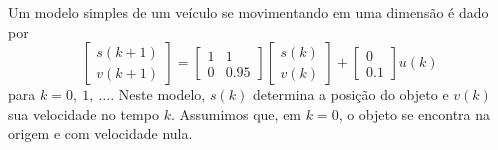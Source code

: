 \begin{problem}
Um modelo simples de um veículo se movimentando em uma dimensão é dado por
         \begin{equation*}
           \begin{bmatrix} s(k+1) \\ v(k+1) \end{bmatrix} = \begin{bmatrix} 1 & 1 \\ 0 & 0.95 \end{bmatrix} \begin{bmatrix} s(k) \\ v(k) \end{bmatrix} + \begin{bmatrix} 0 \\ 0.1 \end{bmatrix} u(k)
         \end{equation*}
para $k = 0,~1,~\ldots$. Neste modelo, $s(k)$ determina a posição do objeto e $v(k)$ sua velocidade no tempo $k$. Assumimos que, em $k=0$, o objeto se encontra na origem e com velocidade nula. 


\end{problem}
